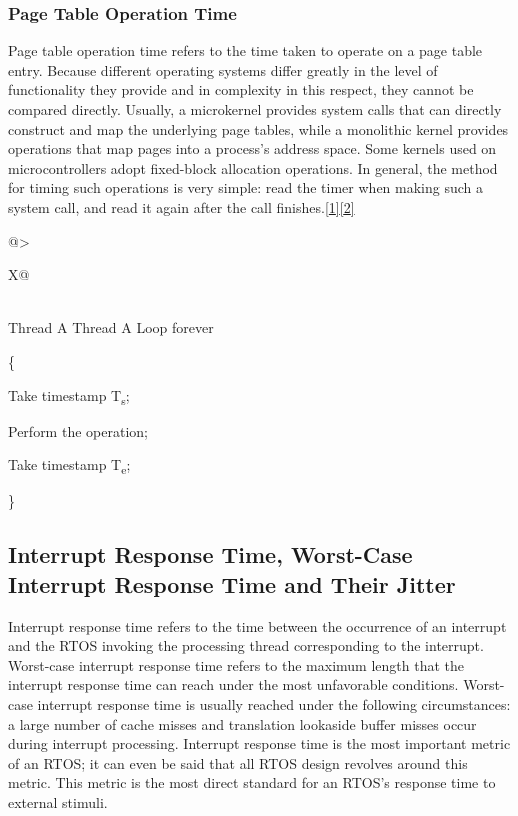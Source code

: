 \subsubsection{Page Table Operation Time}\label{subsubsec:1-page-table-operation-time}

Page table operation time refers to the time taken to operate on a page table entry. Because different operating systems differ greatly in the level of functionality they provide and in complexity in this respect, they cannot be compared directly. Usually, a microkernel provides system calls that can directly construct and map the underlying page tables, while a monolithic kernel provides operations that map pages into a process's address space. Some kernels used on microcontrollers adopt fixed-block allocation operations. In general, the method for timing such operations is very simple: read the timer when making such a system call, and read it again after the call finishes.\hyperref[cite:1-1]{{[}1{]}}\hyperref[cite:1-2]{{[}2{]}}

\begin{xltabular}{\textwidth}{@{}>{\hsize\raggedright\arraybackslash}X@{}}
\caption{Page table operations}\label{tab:1-11-page-table-operations}\\
\toprule
Thread A\tabularnewline
\endfirsthead
\toprule
Thread A\tabularnewline
\midrule
\endhead
\bottomrule
\endlastfoot
Loop forever

\{

Take timestamp T\textsubscript{s};

Perform the operation;

Take timestamp T\textsubscript{e};

\}\strut
\tabularnewline
\end{xltabular}
\nopagebreak[4]

\subsection{Interrupt Response Time, Worst-Case Interrupt Response Time and Their Jitter}\label{subsec:1-interrupt-response-time-and-jitter}

Interrupt response time refers to the time between the occurrence of an interrupt and the RTOS invoking the processing thread corresponding to the interrupt. Worst-case interrupt response time refers to the maximum length that the interrupt response time can reach under the most unfavorable conditions. Worst-case interrupt response time is usually reached under the following circumstances: a large number of cache misses and translation lookaside buffer misses occur during interrupt processing. Interrupt response time is the most important metric of an RTOS; it can even be said that all RTOS design revolves around this metric. This metric is the most direct standard for an RTOS's response time to external stimuli.

